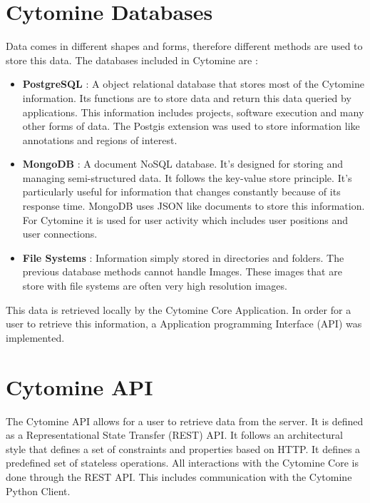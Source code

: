 \documentclass[a4paper,11pt]{report}
\numberwithin{figure}{chapter} %
\begin{document}
    \section{Cytomine Databases}
    Data comes in different shapes and forms, therefore different methods are used to store this data.
    The databases included in Cytomine are :
    \begin{itemize}
        \item[\textbullet] \textbf{PostgreSQL} : A object relational database that stores most of the Cytomine information.
        Its functions are to store data and return this data queried by applications.
        This information includes projects, software execution and many other forms of data.
        The Postgis extension was used to store information like annotations and regions of interest.
        \item[\textbullet] \textbf{MongoDB} : A document NoSQL database.
        It's designed for storing and managing semi-structured data.
        It follows the key-value store principle.
        It's particularly useful for information that changes constantly because of its response time.
        MongoDB uses JSON like documents to store this information.
        For Cytomine it is used for user activity which includes user positions and user connections.
        \item[\textbullet] \textbf{File Systems} : Information simply stored in directories and folders.
        The previous database methods cannot handle Images.
        These images that are store with file systems are often very high resolution images.
    \end{itemize}

    This data is retrieved locally by the Cytomine Core Application.
    In order for a user to retrieve this information, a Application programming Interface (API) was implemented.


    \section{Cytomine API}

    The Cytomine API allows for a user to retrieve data from the server.
    It is defined as a Representational State Transfer (REST) API.
    It follows an architectural style that defines a set of constraints and properties based on HTTP.
    It defines a predefined set of stateless operations.
    All interactions with the Cytomine Core is done through the REST API.
    This includes communication with the Cytomine Python Client.\\
\end{document}
